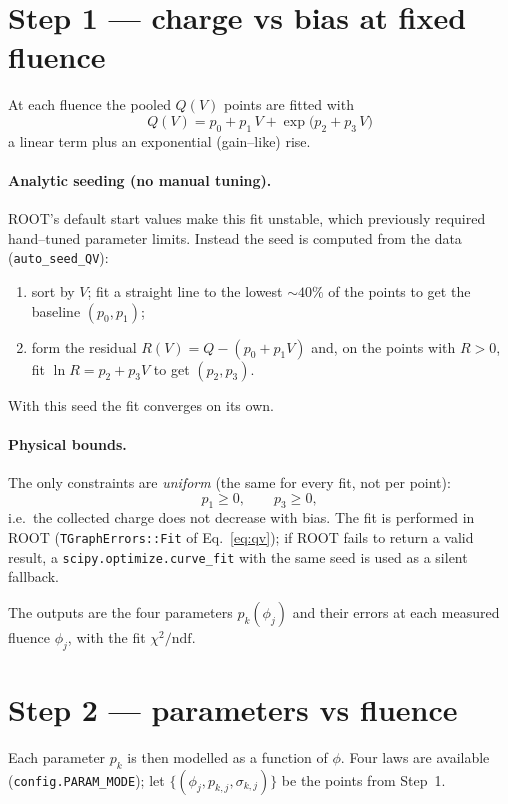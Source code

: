 \documentclass[11pt]{article}
\newcommand{\code}[1]{\texttt{#1}}
\begin{document}
\section{Step 1 --- charge vs bias at fixed fluence}\label{sec:step1}
At each fluence the pooled $Q(V)$ points are fitted with
\begin{equation}
  \boxed{\,Q(V) = p_0 + p_1\,V + \exp\!\big(p_2 + p_3\,V\big)\,}
  \label{eq:qv}
\end{equation}
a linear term plus an exponential (gain--like) rise.

\paragraph{Analytic seeding (no manual tuning).} ROOT's default start values make
this fit unstable, which previously required hand--tuned parameter limits. Instead
the seed is computed from the data (\code{auto\_seed\_QV}):
\begin{enumerate}[nosep]
  \item sort by $V$; fit a straight line to the lowest ${\sim}40\%$ of the points
        to get the baseline $(p_0,p_1)$;
  \item form the residual $R(V)=Q-(p_0+p_1V)$ and, on the points with $R>0$,
        fit $\ln R = p_2 + p_3 V$ to get $(p_2,p_3)$.
\end{enumerate}
With this seed the fit converges on its own.

\paragraph{Physical bounds.} The only constraints are \emph{uniform} (the same for
every fit, not per point):
\begin{equation}
  p_1 \ge 0, \qquad p_3 \ge 0,
\end{equation}
i.e.\ the collected charge does not decrease with bias. The fit is performed in
ROOT (\code{TGraphErrors::Fit} of Eq.~\ref{eq:qv}); if ROOT fails to return a
valid result, a \code{scipy.optimize.curve\_fit} with the same seed is used as a
silent fallback.

The outputs are the four parameters $p_k(\phi_j)$ and their errors at each measured
fluence $\phi_j$, with the fit $\chi^2/\mathrm{ndf}$.

\section{Step 2 --- parameters vs fluence}\label{sec:step2}
Each parameter $p_k$ is then modelled as a function of $\phi$. Four laws are
available (\code{config.PARAM\_MODE}); let $\{(\phi_j,p_{k,j},\sigma_{k,j})\}$ be
the points from Step~1.
\end{document}
